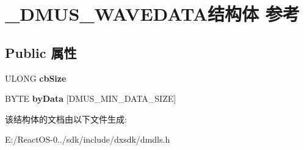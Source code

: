 \hypertarget{struct___d_m_u_s___w_a_v_e_d_a_t_a}{}\section{\+\_\+\+D\+M\+U\+S\+\_\+\+W\+A\+V\+E\+D\+A\+T\+A结构体 参考}
\label{struct___d_m_u_s___w_a_v_e_d_a_t_a}
\subsection*{Public 属性}
\begin{DoxyCompactItemize}
\item 
\mbox{\label{struct___d_m_u_s___w_a_v_e_d_a_t_a_aa9f55f23699372de2cf156e4197652b3}} 
U\+L\+O\+NG {\bfseries cb\+Size}
\item 
\mbox{\label{struct___d_m_u_s___w_a_v_e_d_a_t_a_a173263a46cf32e6cd185b4f2128241a8}} 
B\+Y\+TE {\bfseries by\+Data} \mbox{[}D\+M\+U\+S\+\_\+\+M\+I\+N\+\_\+\+D\+A\+T\+A\+\_\+\+S\+I\+ZE\mbox{]}
\end{DoxyCompactItemize}


该结构体的文档由以下文件生成\+:\begin{DoxyCompactItemize}
\item 
E\+:/\+React\+O\+S-\/0../sdk/include/dxsdk/dmdls.\+h\end{DoxyCompactItemize}
